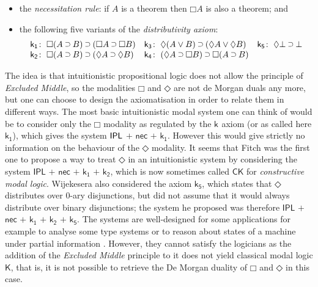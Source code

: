 \documentclass[a4paper]{article}
\theoremstyle{plain}
\theoremstyle{definition}
\newcommand*{\ax}[1]{\mathsf{#1}}
\newcommand*{\kax}[1][]		{\ax{k_{#1}}}
\newcommand*{\IK}{\mathsf{IK}}
\newcommand*{\K}{\mathsf{K}}
\newcommand*{\OR}{\mathbin{\vee}}
\newcommand*{\BOT}{\mathord{\bot}}
\newcommand*{\IMP}{\mathbin{\scalebox{.9}{\raise.2ex\hbox{$\supset$}}}}
\newcommand*{\BOX}{\mathord{\Box}}
\newcommand*{\DIA}{\mathord{\Diamond}}
\newcommand*{\rn}[1]  {\ensuremath{\mathsf{#1}}}
\begin{document}
\begin{itemize}
	\item the \emph{necessitation rule}: if $A$ is a theorem then $\BOX A$ is also a theorem; and
	\item the following five variants of the \emph{distributivity axiom}:
	\begin{equation*}
	\label{eq:ik}%
	\begin{array}[t]{r@{\;}l@{\quad}r@{\;}l@{\quad}r@{\;}l}
	\kax[1]\colon&\BOX(A\IMP B)\IMP(\BOX A\IMP\BOX B)
	&
	\kax[3]\colon&\DIA(A\OR B)\IMP(\DIA A\OR\DIA B)
	&
	\kax[5]\colon&\DIA\BOT\IMP\BOT
	\\
	\kax[2]\colon&\BOX(A\IMP B)\IMP(\DIA A\IMP\DIA B)
	&
	\kax[4]\colon&(\DIA A\IMP \BOX B)\IMP\BOX(A\IMP B)\\%
	\end{array}
	\end{equation*}
\end{itemize}

The idea is that intuitionistic propositional logic does not allow the principle of \emph{Excluded Middle}, so the modalities $\BOX$ and $\DIA$ are not de Morgan duals any more, but one can choose to design the axiomatisation in order to relate them in different ways. The most basic intuitionistic modal system one can think of would be to consider only the $\BOX$ modality as regulated by the $\kax$ axiom (or as called here $\kax[1]$), which gives the system $\break \rn{IPL}$ $\rn{+}$ $\rn{nec}$ $\rn{+}$ $\kax[1]$. However this would give strictly no information on the behaviour of the $\DIA$ modality.
It seems that Fitch \cite{Fitch} was the first one to propose a way to treat $\DIA$ in an intuitionistic system by considering the system  $\rn{IPL}$ $\rn{+}$ $\rn{nec}$ $\rn{+}$ $\kax[1]$ $\rn{+}$ $\kax[2]$, which is now sometimes called $\rn{CK}$ for \emph{constructive modal logic}. Wijekesera \cite{Wijekesera:1990} also considered the axiom $\kax[5]$, which states that $\DIA$ distributes over 0-ary disjunctions, but did not assume that it would always distribute over binary disjunctions; the system he proposed was therefore  $\rn{IPL}$ $\rn{+}$ $\rn{nec}$ $\rn{+}$ $\kax[1]$ $\rn{+}$ $\kax[2]$  $\rn{+}$ $\kax[5]$. The systems are well-designed for some applications for example to analyse some type systems \cite{Benton:1998} or to reason about states of a machine under partial information \cite{WijesekeraNerode:2005}. However, they cannot satisfy the logicians as the addition of the \emph{Excluded Middle} principle to it does not yield classical modal logic $\K$, that is, it is not possible to retrieve the De Morgan duality of $\BOX$ and $\DIA$ in this case.
\end{document}
